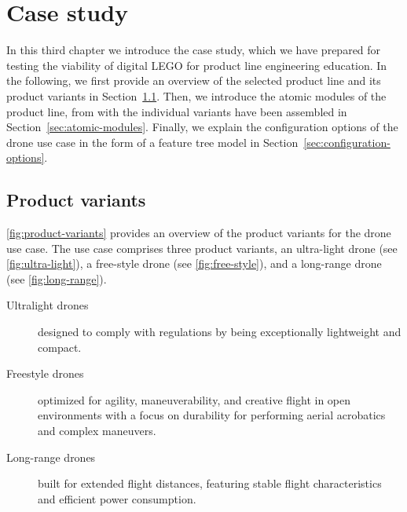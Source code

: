 \documentclass[sigconf,review]{acmart}
\begin{document}
\section{Case study}
\label{sec:case-study}

In this third chapter we introduce the case study, which we have prepared for testing the viability of digital LEGO for product line engineering education.
In the following, we first provide an overview of the selected product line and its product variants in Section~\ref{sec:product-variants}.
Then, we introduce the atomic modules of the product line, from with the individual variants have been assembled in Section~\ref{sec:atomic-modules}.
Finally, we explain the configuration options of the drone use case in the form of a feature tree model in Section~\ref{sec:configuration-options}.

\subsection{Product variants}
\label{sec:product-variants}

\cref{fig:product-variants} provides an overview of the product variants for the drone use case.
The use case comprises three product variants, an ultra-light drone (see \cref{fig:ultra-light}), a free-style drone (see \cref{fig:free-style}), and a long-range drone (see \cref{fig:long-range}).

\begin{description}
    \item[Ultralight drones] designed to comply with regulations by being exceptionally lightweight and compact.
    \item[Freestyle drones] optimized for agility, maneuverability, and creative flight in open environments with a focus on durability for performing aerial acrobatics and complex maneuvers.
    \item[Long-range drones] built for extended flight distances, featuring stable flight characteristics and efficient power consumption.
\end{description}

\end{document}
